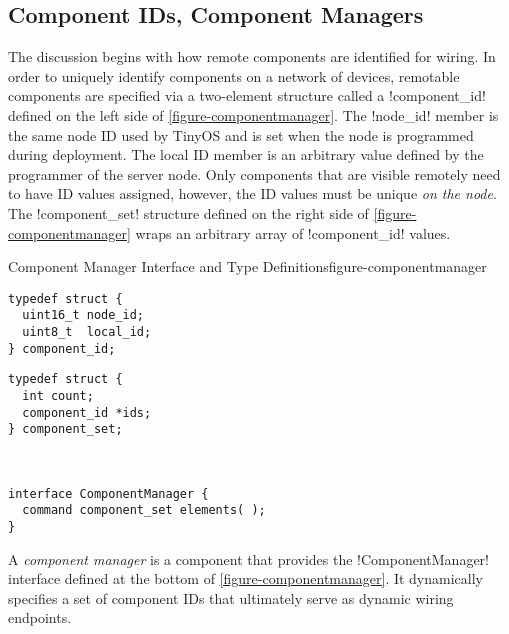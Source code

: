 \subsection{Component IDs, Component Managers}
\label{section-componentmanager}

The discussion begins with how remote components are identified for wiring. In order to uniquely
identify components on a network of devices, remotable components are specified via a
two-element structure called a !component_id! defined on the left side of
\autoref{figure-componentmanager}. The !node_id! member is the same node ID used by TinyOS and
is set when the node is programmed during deployment. The local ID member is an arbitrary value
defined by the programmer of the server node. Only components that are visible remotely need to
have ID values assigned, however, the ID values must be unique \emph{on the node}. The
!component_set! structure defined on the right side of \autoref{figure-componentmanager} wraps
an arbitrary array of !component_id! values.
 
\begin{fpfig}[t]{Component Manager Interface and Type Definitions}{figure-componentmanager}
{
\begin{minipage}[t]{2.5in}
\singlespace
\begin{lstlisting}
typedef struct {
  uint16_t node_id;
  uint8_t  local_id;
} component_id;
\end{lstlisting}
\primaryspacing
\end{minipage}
\hfill
\begin{minipage}[t]{2.5in}
\singlespace
\begin{lstlisting}
typedef struct {
  int count;
  component_id *ids;
} component_set;
\end{lstlisting}
\primaryspacing
\end{minipage}
\\
\begin{center}
\begin{minipage}[t]{3.75in}
\singlespace
\begin{lstlisting}
interface ComponentManager {
  command component_set elements( );
}
\end{lstlisting}
\primaryspacing
\end{minipage}
\end{center}
}
\end{fpfig}

A \emph{component manager} is a component that provides the !ComponentManager! interface defined
at the bottom of \autoref{figure-componentmanager}. It dynamically specifies a set of component
IDs that ultimately serve as dynamic wiring endpoints.


